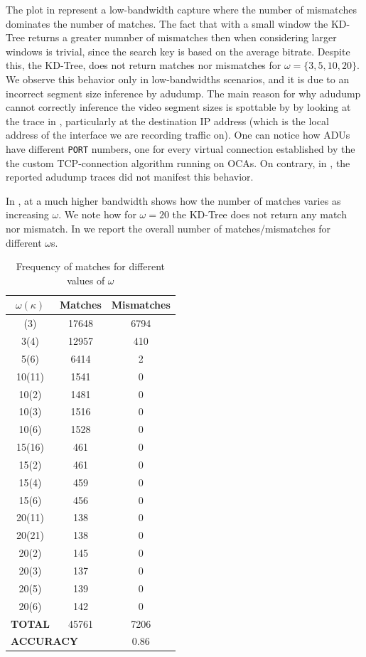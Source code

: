 The plot in  represent a low-bandwidth capture where the
number of mismatches dominates the number of matches. The fact that with a
small window the KD-Tree returns a greater numnber of mismatches then when
considering larger windows is trivial, since the search key is based on the
average bitrate. Despite this, the KD-Tree, does not return matches nor
mismatches for $\omega = \{3, 5, 10, 20\}$.  We observe this behavior only in
low-bandwidths scenarios, and it is due to an incorrect segment size inference
by adudump. The main reason for why adudump cannot correctly inference the
video segment sizes is spottable by  by looking at the trace in
, particularly at the destination IP address (which is the
local address of the interface we are recording traffic on). One can notice how
ADUs have different \texttt{PORT} numbers, one for every virtual connection
established by the the custom TCP-connection algorithm running on OCAs. On
contrary, in \cite{netflix-real-time}, the reported adudump traces did not
manifest this behavior.

In , at a much higher bandwidth shows how the number of
matches varies as increasing $\omega$. We note how for $\omega=20$ the KD-Tree
does not return any match nor mismatch. In  we report the
overall number of matches/mismatches for different $\omega$s.

\begin{longtable}{|c c c|}
\caption{Frequency of matches for different values of $\omega$}\label{tab:matches}\\
\hline
$\omega(\kappa)$ &
\textbf{Matches} &
\textbf{Mismatches} \\
\hline
\endhead
\hline
\endfoot
2(3)	& 17648	& 6794 \\
3(4)	& 12957	& 410 \\
5(6)	& 6414	& 2 \\
10(11)	& 1541	& 0 \\
10(2)	& 1481	& 0 \\
10(3)	& 1516	& 0 \\
10(6)	& 1528	& 0 \\
15(16)	& 461	& 0 \\
15(2)	& 461	& 0 \\
15(4)	& 459	& 0 \\
15(6)	& 456	& 0 \\
20(11)	& 138	& 0 \\
20(21)	& 138	& 0 \\
20(2)	& 145	& 0 \\
20(3)	& 137	& 0 \\
20(5)	& 139	& 0 \\
20(6)	& 142	& 0 \\
\hline
\textbf{TOTAL} & 45761 & 7206 \\
\multicolumn{2}{|l}{\textbf{ACCURACY}} & 0.86 \\
\end{longtable}

